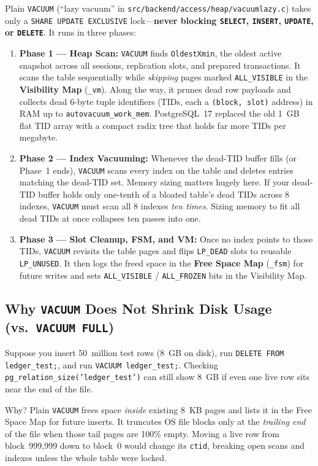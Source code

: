 Plain \texttt{VACUUM} (``lazy vacuum'' in \texttt{src/backend/access/heap/vacuumlazy.c}) takes only a \texttt{SHARE UPDATE EXCLUSIVE} lock---\textbf{never blocking \texttt{SELECT}, \texttt{INSERT}, \texttt{UPDATE}, or \texttt{DELETE}}. It runs in three phases:
\begin{enumerate}
  \item \textbf{Phase 1 --- Heap Scan:} \texttt{VACUUM} finds \texttt{OldestXmin}, the oldest active snapshot across all sessions, replication slots, and prepared transactions. It scans the table sequentially while \emph{skipping} pages marked \texttt{ALL\_VISIBLE} in the \textbf{Visibility Map} (\texttt{\_vm}). Along the way, it prunes dead row payloads and collects dead 6-byte tuple identifiers (TIDs, each a \texttt{(block, slot)} address) in RAM up to \texttt{autovacuum\_work\_mem}. PostgreSQL~17 replaced the old 1~GB flat TID array with a compact radix tree that holds far more TIDs per megabyte.
  \item \textbf{Phase 2 --- Index Vacuuming:} Whenever the dead-TID buffer fills (or Phase~1 ends), \texttt{VACUUM} scans every index on the table and deletes entries matching the dead-TID set. Memory sizing matters hugely here. If your dead-TID buffer holds only one-tenth of a bloated table's dead TIDs across 8 indexes, \texttt{VACUUM} must scan all 8 indexes \emph{ten times}. Sizing memory to fit all dead TIDs at once collapses ten passes into one.
  \item \textbf{Phase 3 --- Slot Cleanup, FSM, and VM:} Once no index points to those TIDs, \texttt{VACUUM} revisits the table pages and flips \texttt{LP\_DEAD} slots to reusable \texttt{LP\_UNUSED}. It then logs the freed space in the \textbf{Free Space Map} (\texttt{\_fsm}) for future writes and sets \texttt{ALL\_VISIBLE} / \texttt{ALL\_FROZEN} bits in the Visibility Map.
\end{enumerate}

\subsection{Why \texttt{VACUUM} Does Not Shrink Disk Usage (vs.\ \texttt{VACUUM FULL})}

Suppose you insert 50~million test rows (8~GB on disk), run \texttt{DELETE FROM ledger\_test;}, and run \texttt{VACUUM ledger\_test;}. Checking \texttt{pg\_relation\_size('ledger\_test')} can still show 8~GB if even one live row sits near the end of the file.

Why? Plain \texttt{VACUUM} frees space \emph{inside} existing 8~KB pages and lists it in the Free Space Map for future inserts. It truncates OS file blocks only at the \emph{trailing end} of the file when those tail pages are 100\% empty. Moving a live row from block~999,999 down to block~0 would change its \texttt{ctid}, breaking open scans and indexes unless the whole table were locked.

